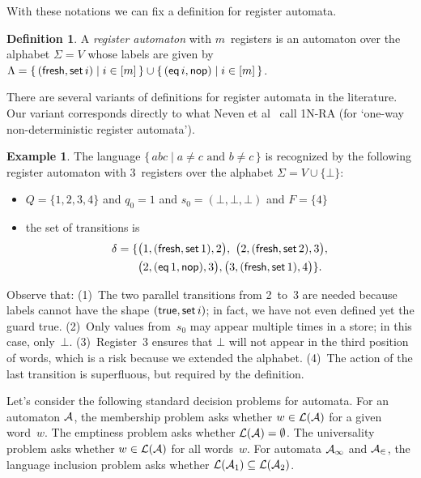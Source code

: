 \documentclass[9pt, preprint]{sigplanconf} %
\theoremstyle{definition}
\newtheorem{definition}{Definition}
\newtheorem{example}{Example}
\theoremstyle{remark}
\begin{document}
With these notations we can fix a definition for register automata.

\begin{definition}
A \emph{register automaton} with $m$~registers is an automaton over the alphabet $\Sigma=V$ whose labels are given by $\Lambda=\{\,({\sf fresh},{\sf set}\,i)\mid i\in[m]\,\}\cup\{\, ({\sf eq}\,i, {\sf nop})  \mid i\in[m] \,\}$.
\label{def:ra}
\end{definition}

There are several variants of definitions for register automata in the literature.
Our variant corresponds directly to what Neven et al~\cite{dblp:conf/mfcs/nevensv01} call 1N-RA (for `one-way non-deterministic register automata').

\begin{example}\label{ex:ra1}
The language $\{\,abc\mid\text{$a\ne c$ and $b\ne c$}\,\}$ is recognized by the following register automaton with $3$~registers over the alphabet $\Sigma=V\cup\{\bot\}$:
\begin{itemize}
\item $Q=\{1,2,3,4\}$
  and $q_0=1$
  and $s_0=(\bot,\bot,\bot)$
  and $F=\{4\}$
\item the set of transitions is
\begin{align*}\delta =\{ & \bigl(1,({\sf fresh},{\sf set}\,1),2\bigr), \ \bigl(2,({\sf fresh},{\sf set}\,2),3\bigr), \\
& \bigl(2,({\sf eq}\,1,{\sf nop}),3\bigr), \bigl(3,({\sf fresh},{\sf set}\,1),4\bigr) \}.
\end{align*}
\end{itemize}
Observe that:
(1)~The two parallel transitions from 2~to~3 are needed because labels cannot have the shape $({\sf true},{\sf set}\,i)$; in fact, we have not even defined yet the guard {\sf true}.
(2)~Only values from~$s_0$ may appear multiple times in a store; in this case, only~$\bot$.
(3)~Register~3 ensures that $\bot$ will not appear in the third position of words, which is a risk because we extended the alphabet.
(4)~The action of the last transition is superfluous, but required by the definition.
\end{example}

Let's consider the following  standard decision problems for automata. For an automaton ${\cal A}$,
the membership problem asks whether $w\in {\cal L}({\cal A})$ for a given word~$w$.
The emptiness problem asks whether ${\cal L}({\cal A}) = \emptyset$.
The  universality problem asks whether $w\in{\cal L}({\cal A})$ for all words~$w$.
For automata ${\cal A_1}$ and ${\cal A_2}$, the  language inclusion problem asks whether ${\cal L}({\cal A}_1) \subseteq {\cal L}({\cal A}_2)$.
\end{document}
